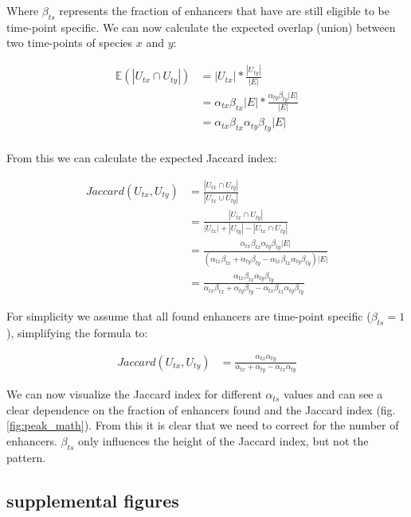 Where $\beta_{ts}$ represents the fraction of enhancers that have are still eligible to be time-point specific. We can now calculate the expected overlap (union) between two time-points of species $x$ and $y$:

\begin{align*}
    \mathbb{E}(|U_{tx} \cap U_{ty}|) & = |U_{tx}| * \frac{|U_{ty}|}{|E|} \\
    & = \alpha_{tx} \beta_{tx} |E| * \frac{\alpha_{ty} \beta_{ty} |E|}{|E|} \\
    & = \alpha_{tx} \beta_{tx} \alpha_{ty} \beta_{ty} |E| \\
\end{align*}

From this we can calculate the expected Jaccard index:

\begin{align*}
    Jaccard(U_{tx}, U_{ty}) & = \frac{|U_{tx} \cap U_{ty}|}{|U_{tx} \cup U_{ty}|} \\
    & = \frac{|U_{tx} \cap U_{ty}|}{|U_{tx}| + |U_{ty}| - |U_{tx} \cap U_{ty}|} \\
    & = \frac{\alpha_{tx} \beta_{tx} \alpha_{ty} \beta_{ty} |E|}{(\alpha_{tx} \beta_{tx} + \alpha_{ty} \beta_{ty} - \alpha_{tx} \beta_{tx} \alpha_{ty} \beta_{ty})|E|} \\
    & = \frac{\alpha_{tx} \beta_{tx} \alpha_{ty} \beta_{ty}}{\alpha_{tx} \beta_{tx} + \alpha_{ty} \beta_{ty} - \alpha_{tx} \beta_{tx} \alpha_{ty} \beta_{ty}}
\end{align*}

For simplicity we assume that all found enhancers are time-point specific ($\beta_{ts} = 1$), simplifying the formula to:

\begin{align*}
    Jaccard(U_{tx}, U_{ty}) & = \frac{\alpha_{tx} \alpha_{ty}}{\alpha_{tx} + \alpha_{ty} - \alpha_{tx} \alpha_{ty}}
\end{align*}

We can now visualize the Jaccard index for different $\alpha_{ts}$ values and can see a clear dependence on the fraction of enhancers found and the Jaccard index (fig. \ref{fig:peak_math}). From this it is clear that we need to correct for the number of enhancers. $\beta_{ts}$ only influences the height of the Jaccard index, but not the pattern.

\subsection{supplemental figures}
\beginsupplement

